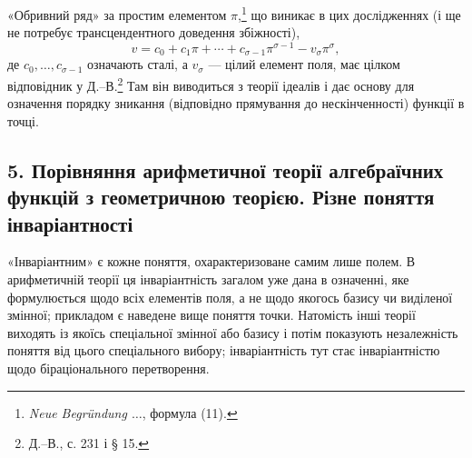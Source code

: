 \documentclass[11pt]{article}
\begin{document}
«Обривний ряд» за простим елементом \(\pi\),\footnote{\emph{Neue Begründung \(\ldots\)}, формула (11).} що виникає в цих дослідженнях (і ще не потребує трансцендентного доведення збіжності),
\[
v=c_0+c_1\pi+\cdots+c_{\sigma-1}\pi^{\sigma-1}-v_\sigma\pi^\sigma,
\]
де \(c_0,\ldots,c_{\sigma-1}\) означають сталі, а \(v_\sigma\) --- цілий елемент поля, має цілком відповідник у Д.--В.\footnote{Д.--В., с. 231 і § 15.} Там він виводиться з теорії ідеалів і дає основу для означення порядку зникання (відповідно прямування до нескінченності) функції в точці.

\subsection*{5. Порівняння арифметичної теорії алгебраїчних функцій з геометричною теорією. Різне поняття інваріантності}
«Інваріантним» є кожне поняття, охарактеризоване самим лише полем. В арифметичній теорії ця інваріантність загалом уже дана в означенні, яке формулюється щодо всіх елементів поля, а не щодо якогось базису чи виділеної змінної; прикладом є наведене вище поняття точки. Натомість інші теорії виходять із якоїсь спеціальної змінної або базису і потім показують незалежність поняття від цього спеціального вибору; інваріантність тут стає інваріантністю щодо біраціонального перетворення.
\end{document}
